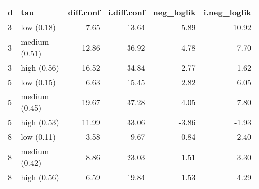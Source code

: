 \begin{table}[ht]
\centering
\begin{tabular}{llrrrr}
  \hline
d & tau & diff.conf & i.diff.conf & neg\_loglik & i.neg\_loglik \\ 
  \hline
3 & low (0.18) & 7.65 & 13.64 & 5.89 & 10.92 \\ 
  3 & medium (0.51) & 12.86 & 36.92 & 4.78 & 7.70 \\ 
  3 & high (0.56) & 16.52 & 34.84 & 2.77 & -1.62 \\ 
  5 & low (0.15) & 6.63 & 15.45 & 2.82 & 6.05 \\ 
  5 & medium (0.45) & 19.67 & 37.28 & 4.05 & 7.80 \\ 
  5 & high (0.53) & 11.99 & 33.06 & -3.86 & -1.93 \\ 
  8 & low (0.11) & 3.58 & 9.67 & 0.84 & 2.40 \\ 
  8 & medium (0.42) & 8.86 & 23.03 & 1.51 & 3.30 \\ 
  8 & high (0.56) & 6.59 & 19.84 & 1.53 & 4.29 \\ 
   \hline
\end{tabular}
\end{table}
